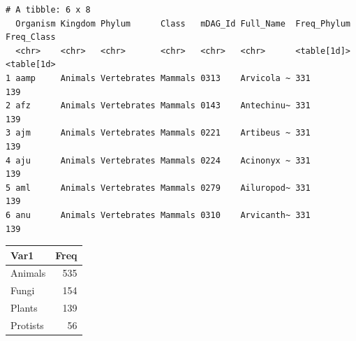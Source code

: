 \documentclass[
  letterpaper,
  DIV=11,
  numbers=noendperiod]{scrreprt}
\newenvironment{Shaded}{}{}
\newcommand{\AttributeTok}[1]{\textcolor[rgb]{0.78,0.47,0.87}{#1}}
\newcommand{\FunctionTok}[1]{\textcolor[rgb]{0.38,0.69,0.94}{#1}}
\newcommand{\NormalTok}[1]{\textcolor[rgb]{0.67,0.70,0.75}{#1}}
\newcommand{\SpecialCharTok}[1]{\textcolor[rgb]{0.34,0.71,0.76}{#1}}
\newcommand{\StringTok}[1]{\textcolor[rgb]{0.60,0.76,0.47}{#1}}
\begin{document}
\begin{verbatim}
# A tibble: 6 x 8
  Organism Kingdom Phylum      Class   mDAG_Id Full_Name  Freq_Phylum Freq_Class
  <chr>    <chr>   <chr>       <chr>   <chr>   <chr>      <table[1d]> <table[1d>
1 aamp     Animals Vertebrates Mammals 0313    Arvicola ~ 331         139       
2 afz      Animals Vertebrates Mammals 0143    Antechinu~ 331         139       
3 ajm      Animals Vertebrates Mammals 0221    Artibeus ~ 331         139       
4 aju      Animals Vertebrates Mammals 0224    Acinonyx ~ 331         139       
5 aml      Animals Vertebrates Mammals 0279    Ailuropod~ 331         139       
6 anu      Animals Vertebrates Mammals 0310    Arvicanth~ 331         139       
\end{verbatim}

\begin{Shaded}
\end{Shaded}

\begin{tabular}{l|r}
\hline
Var1 & Freq\\
\hline
Animals & 535\\
\hline
Fungi & 154\\
\hline
Plants & 139\\
\hline
Protists & 56\\
\hline
\end{tabular}

\begin{Shaded}
\end{Shaded}
\end{document}
